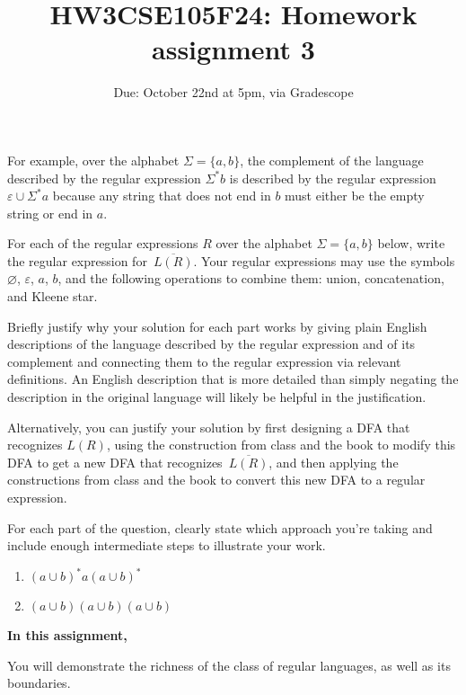 \begin{enumerate}[wide, labelwidth=!, labelindent=0pt]
For example, over the alphabet $\Sigma = \{a,b\}$, the complement of the language described 
by the regular expression $\Sigma^* b$ is described by the regular expression $\varepsilon \cup \Sigma^*a$
because any string that does not end in $b$
must either be the empty string or end in $a$.

For each of the regular expressions $R$ over the alphabet $\Sigma = \{a,b\}$ below, write the regular 
expression for~$\overline{L(R)}$. Your regular expressions may use the symbols
$\varnothing$, $\varepsilon$, $a$, $b$, and the 
following operations to combine them: union, concatenation, 
and Kleene star.

Briefly justify why your solution for each part works by giving plain English descriptions of the language 
described by the regular expression and of its complement and connecting them to the regular 
expression via relevant definitions. An English description that is more 
detailed than simply negating the description in the original language will likely be helpful in the justification.

Alternatively, you can justify your solution by first designing a DFA that recognizes $L(R)$, 
using the construction from class and the book to modify this DFA to get a new DFA that recognizes~$\overline{L(R)}$, 
and then applying the constructions from class and the book to convert this new DFA to a regular expression.

For each part of the question, clearly state which approach you're taking and include enough intermediate
steps to illustrate your work.


\begin{enumerate}
    \item\gradeCorrect $(a \cup b)^*a(a \cup b)^*$
    \item\gradeCorrect $(a \cup b) (a \cup b) (a \cup b)$
\end{enumerate}

\end{enumerate}
\newpage

\title{HW3CSE105F24: Homework assignment 3}
\date{Due: October 22nd at 5pm, via Gradescope}



\maketitle
\thispagestyle{fancy}

{\bf In this assignment,}

You will demonstrate the richness of the class of regular languages, as well as its boundaries.


